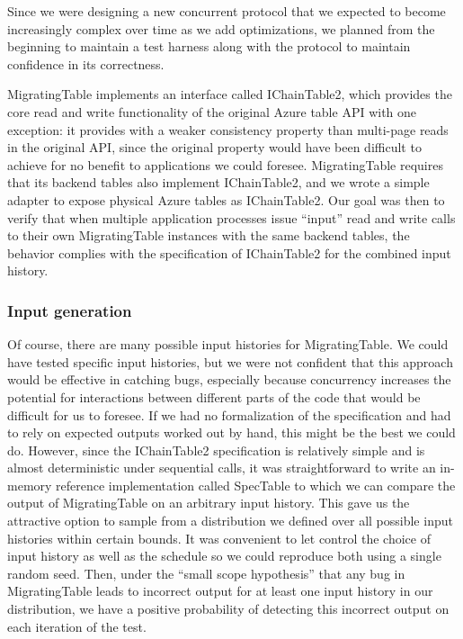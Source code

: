 Since we were designing a new concurrent protocol that we expected to become increasingly complex over time as we add optimizations, we planned from the beginning to maintain a \psharp test harness along with the protocol to maintain confidence in its correctness.

MigratingTable implements an interface called IChainTable2, which provides the core read and write functionality of the original Azure table API with one exception: it provides  with a weaker consistency property than multi-page reads in the original API, since the original property would have been difficult to achieve for no benefit to applications we could foresee.  MigratingTable requires that its backend tables also implement IChainTable2, and we wrote a simple adapter to expose physical Azure tables as IChainTable2.  Our goal was then to verify that when multiple application processes issue ``input'' read and write calls to their own MigratingTable instances with the same backend tables, the behavior complies with the specification of IChainTable2 for the combined input history.

\subsubsection{Input generation}
\label{sec:mtable:input}

Of course, there are many possible input histories for MigratingTable.  We could have tested specific input histories, but we were not confident that this approach would be effective in catching bugs, especially because concurrency increases the potential for interactions between different parts of the code that would be difficult for us to foresee.  If we had no formalization of the specification and had to rely on expected outputs worked out by hand, this might be the best we could do.  However, since the IChainTable2 specification is relatively simple and is almost deterministic under sequential calls, it was straightforward to write an in-memory reference implementation called SpecTable to which we can compare the output of MigratingTable on an arbitrary input history.  This gave us the attractive option to sample from a distribution we defined over all possible input histories within certain bounds.  It was convenient to let \psharp control the choice of input history as well as the schedule so we could reproduce both using a single random seed.  Then, under the ``small scope hypothesis'' that any bug in MigratingTable leads to incorrect output for at least one input history in our distribution, we have a positive probability of detecting this incorrect output on each iteration of the \psharp test.

